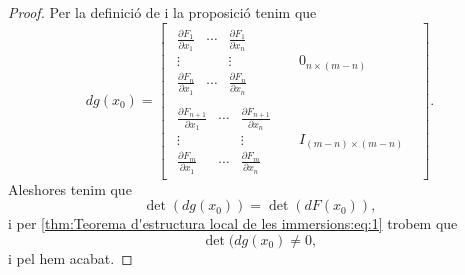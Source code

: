 \documentclass[../Apunts.tex]{subfiles}
\begin{document}
\begin{theorem}
\begin{proof}
			Per la definició de  i la proposició  tenim que
			\[dg(x_{0})=\left[\begin{array}{c|ccc}
				\begin{matrix}
					\frac{\partial F_{1}}{\partial x_{1}} & \cdots & \frac{\partial F_{1}}{\partial x_{n}} \\
					\vdots & & \vdots \\
					\frac{\partial F_{n}}{\partial x_{1}} & \cdots & \frac{\partial F_{n}}{\partial x_{n}}
				\end{matrix} & & 0_{n\times(m-n)} & \\ \hline
				\begin{matrix}
					\frac{\partial F_{n+1}}{\partial x_{1}} & \cdots & \frac{\partial F_{n+1}}{\partial x_{n}} \\
					\vdots & & \vdots \\
					\frac{\partial F_{m}}{\partial x_{1}} & \cdots & \frac{\partial F_{m}}{\partial x_{n}}
				\end{matrix} & & I_{(m-n)\times(m-n)} &
			\end{array}\right].\]
			Aleshores tenim que
			\[\det(dg(x_{0}))=\det(dF(x_{0})),\]
			i per \eqref{thm:Teorema d'estructura local de les immersions:eq:1} trobem que
			\[\det(dg(x_{0})\neq0,\]
			i pel  hem acabat.
		\end{proof}
	\end{theorem}
\end{document}
